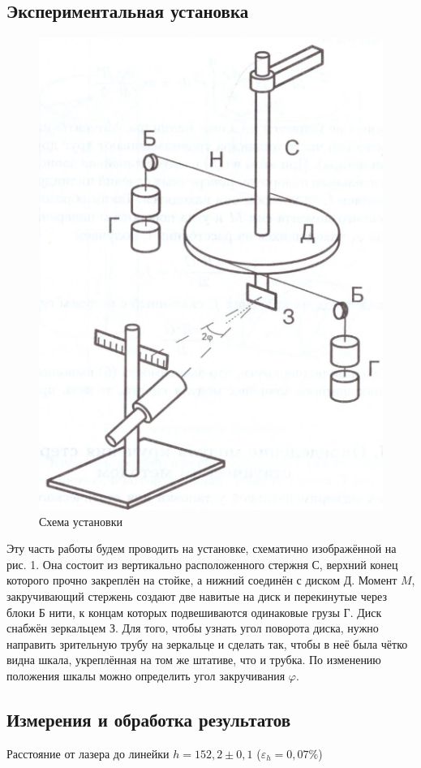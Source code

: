 \documentclass[a4paper, 12pt]{article}
\begin{document}
\subsection{Экспериментальная установка}
\begin{figure}[h]
    \centering
    \includegraphics{stat.png}
    \caption{Схема установки}
    \label{fig:enter-label}
\end{figure}

Эту часть работы будем проводить на установке, схематично изображённой на рис. 1. Она состоит из вертикально расположенного стержня С, верхний конец которого прочно закреплён на стойке, а нижний соединён с диском Д. Момент $M$, закручивающий стержень создают две навитые на диск и перекинутые через блоки Б нити, к концам которых подвешиваются одинаковые грузы Г. Диск снабжён зеркальцем З. Для того, чтобы узнать угол поворота диска, нужно направить зрительную трубу на зеркальце и сделать так, чтобы в неё была чётко видна шкала, укреплённая на том же штативе, что и трубка. По изменению положения шкалы можно определить угол закручивания $\varphi$.
\subsection{Измерения и обработка результатов}
Расстояние от лазера до линейки $h = 152,2\pm0,1$ ($\varepsilon_h = 0,07\%$)
\end{document}
